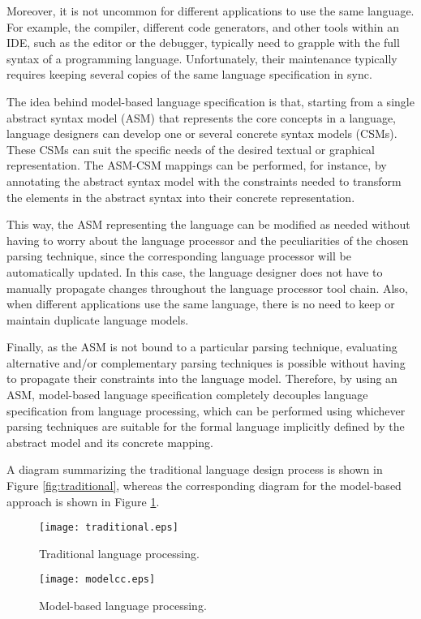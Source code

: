 \documentclass[floatfix,rmp,twocolumn,twoside]{revtex4}
\begin{document}
Moreover, it is not uncommon for different applications to use the same language. For example, the compiler, different code generators, and other tools within an IDE, such as the editor or the debugger, typically need to grapple with the full syntax of a programming language. Unfortunately, their maintenance typically requires keeping several copies of the same language specification in sync.

The idea behind model-based language specification is that, starting from a single abstract syntax model (ASM) that represents the core concepts in a language, language designers can develop one or several concrete syntax models (CSMs). These CSMs can suit the specific needs of the desired textual or graphical representation. The ASM-CSM mappings can be performed, for instance, by annotating the abstract syntax model with the constraints needed to transform the elements in the abstract syntax into their concrete representation.

This way, the ASM representing the language can be modified as needed without having to worry about the language processor and the peculiarities of the chosen parsing technique, since the corresponding language processor will be automatically updated. In this case, the language designer does not have to manually propagate changes throughout the language processor tool chain. Also, when different applications use the same language, there is no need to keep or maintain duplicate language models.

Finally, as the ASM is not bound to a particular parsing technique, evaluating alternative and/or complementary parsing techniques is possible without having to propagate their constraints into the language model. Therefore, by using an ASM, model-based language specification completely decouples language specification from language processing, which can be performed using whichever parsing techniques are suitable for the formal language implicitly defined by the abstract model and its concrete mapping.

A diagram summarizing the traditional language design process is shown in Figure \ref{fig:traditional}, whereas the corresponding diagram for the model-based approach is shown in Figure \ref{fig:ModelCC}.

\begin{figure}[tb]
\begin{minipage}[tb]{\linewidth}
\centering
\texttt{[image: traditional.eps]}
\caption{Traditional language processing.} \label{fig:traditional}

\vspace{4mm}
\texttt{[image: modelcc.eps]}
\caption{Model-based language processing.} \label{fig:ModelCC}
\end{minipage}
\end{figure}
\end{document}
